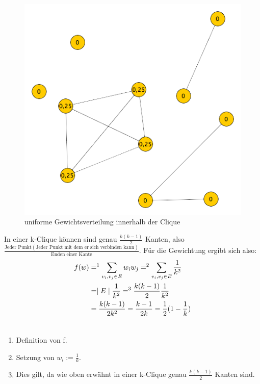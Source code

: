 \documentclass[12pt, a4paper]{article}
\begin{document}
\begin{figure}[H] 
		\centering
		\includegraphics[page=1, width=\textwidth]{assets/proof3_after_second_moving_step}
		\caption{uniforme Gewichtsverteilung innerhalb der Clique} 
\end{figure}

In einer k-Clique können sind genau $\frac{k (k-1)}{2}$ Kanten, also \\
 $\frac{\text{Jeder Punkt} (\text{Jeder Punkt mit dem er sich verbinden kann})}{\text{Enden einer Kante}}$. Für die Gewichtung ergibt sich also:
\begin{gather}
\begin{split}f(w) &=^1 \sum_{v_i, v_j \in E} w_i w_j =^2 \sum_{v_i, v_j \in E} \frac{1}{k^2}  \\
&= \mid E \mid \frac{1}{k^2} =^3 \frac{k (k-1)}{2} \frac{1}{k^2}  \\
&= \frac{k (k-1)}{2k^2} = \frac{k-1}{2k} = \frac{1}{2} (1 - \frac{1}{k})\end{split}\notag\\\begin{split}\end{split}\notag
\end{gather}\begin{enumerate}
\item {}
Definition von f.

\item {}
Setzung von $w_i := \frac{1}{k}$.

\item {}
Dies gilt, da wie oben erwähnt in einer k-Clique genau $\frac{k (k-1)}{2}$ Kanten sind.

\end{enumerate}
\end{document}
